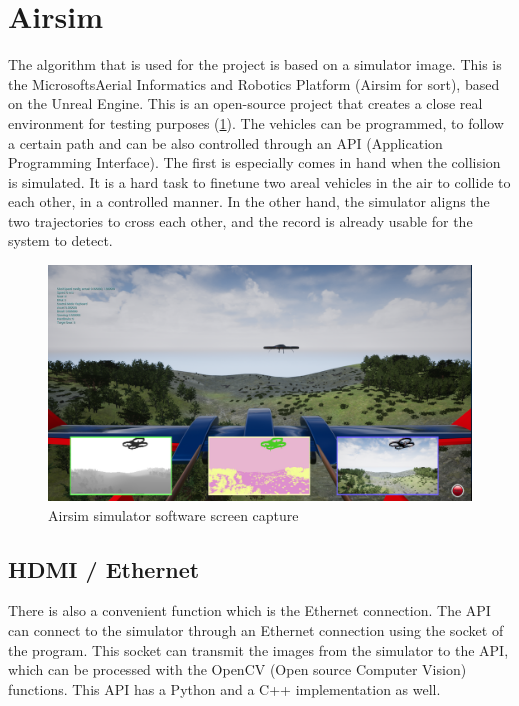 \section{Airsim} %
The algorithm that is used for the project is based on a simulator image.
This is the Microsofts\texttrademark Aerial Informatics and Robotics Platform \cite{AirSim} (Airsim for sort), based on the Unreal Engine\texttrademark \cite{UnrealE}.
This is an open-source project that creates a close real environment for testing purposes (\cref{fig:airsim_screen}).
The vehicles can be programmed, to follow a certain path and can be also controlled through an API (Application Programming Interface).
The first is especially comes in hand when the collision is simulated.
It is a hard task to finetune two areal vehicles in the air to collide to each other, in a controlled manner.
In the other hand, the simulator aligns the two trajectories to cross each other, and the record is already usable for the system to detect.
\begin{figure}
    \centering
    \includegraphics[width=\linewidth]{images/airsim.png}
    \caption{Airsim simulator software screen capture}
    \label{fig:airsim_screen}
\end{figure}

\subsection{HDMI / Ethernet} %
There is also a convenient function which is the Ethernet connection.
The API can connect to the simulator through an Ethernet connection using the socket of the program.
This socket can transmit the images from the simulator to the API, which can be processed with the OpenCV (Open source Computer Vision) functions.
This API has a Python and a C++ implementation as well.

